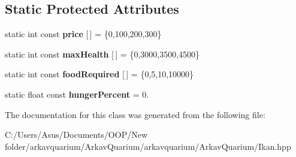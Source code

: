 \subsection*{Static Protected Attributes}
\begin{DoxyCompactItemize}
\item 
\mbox{\label{class_ikan_a603c4e378dd174f68c0d92fd6abc6c8c}} 
static int const {\bfseries price} \mbox{[}$\,$\mbox{]} = \{0,100,200,300\}
\item 
\mbox{\label{class_ikan_a6abbf38f589105f5175268d2dfca3026}} 
static int const {\bfseries max\+Health} \mbox{[}$\,$\mbox{]} = \{0,3000,3500,4500\}
\item 
\mbox{\label{class_ikan_a3bfba959e11072b42cf5e966489dcf6c}} 
static int const {\bfseries food\+Required} \mbox{[}$\,$\mbox{]} = \{0,5,10,10000\}
\item 
\mbox{\label{class_ikan_a6316ec85d20b95b798753e2b36da9ae8}} 
static float const {\bfseries hunger\+Percent} = 0.
\end{DoxyCompactItemize}


The documentation for this class was generated from the following file\+:\begin{DoxyCompactItemize}
\item 
C\+:/\+Users/\+Asus/\+Documents/\+O\+O\+P/\+New folder/arkavquarium/\+Arkav\+Quarium/arkavquarium/\+Arkav\+Quarium/Ikan.\+hpp\end{DoxyCompactItemize}
